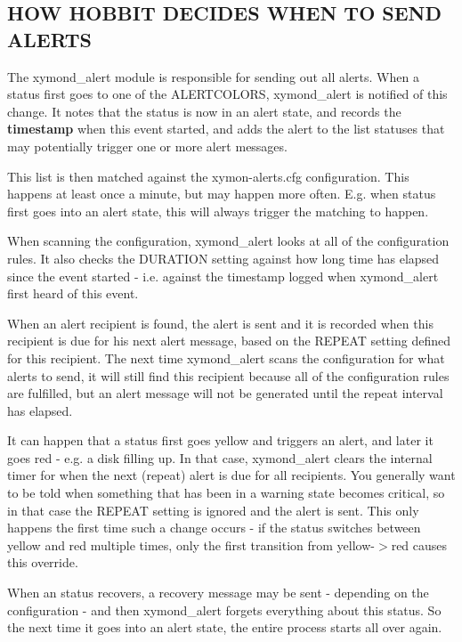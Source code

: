 \subsection{HOW HOBBIT DECIDES WHEN TO SEND ALERTS}
 The xymond\_alert module is responsible for sending out all
 alerts. When a status first goes to one of the ALERTCOLORS,
 xymond\_alert is notified of this change. It notes that the status
 is now in an alert state, and records the \textbf{timestamp} when
 this event started, and adds the alert to the list statuses that may
 potentially trigger one or more alert messages. 


  This list is then matched against the xymon-alerts.cfg
  configuration. This happens at least once a minute, but may happen
  more often. E.g. when status first goes into an alert state, this
  will always trigger the matching to happen. 



  When scanning the configuration, xymond\_alert looks at all of the
  configuration rules. It also checks the DURATION setting against how
  long time has elapsed since the event started - i.e. against the
  timestamp logged when xymond\_alert first heard of this event. 



  When an alert recipient is found, the alert is sent and it is
  recorded when this recipient is due for his next alert message,
  based on the REPEAT setting defined for this recipient. The next
  time xymond\_alert scans the configuration for what alerts to send,
  it will still find this recipient because all of the configuration
  rules are fulfilled, but an alert message will not be generated
  until the repeat interval has elapsed. 



  It can happen that a status first goes yellow and triggers an alert,
  and later it goes red - e.g. a disk filling up. In that case,
  xymond\_alert clears the internal timer for when the next (repeat)
  alert is due for all recipients. You generally want to be told when
  something that has been in a warning state becomes critical, so in
  that case the REPEAT setting is ignored and the alert is sent. This
  only happens the first time such a change occurs - if the status
  switches between yellow and red multiple times, only the first
  transition from yellow-$>$red causes this override. 



  When an status recovers, a recovery message may be sent - depending
  on the configuration - and then xymond\_alert forgets everything
  about this status. So the next time it goes into an alert state, the
  entire process starts all over again. 



